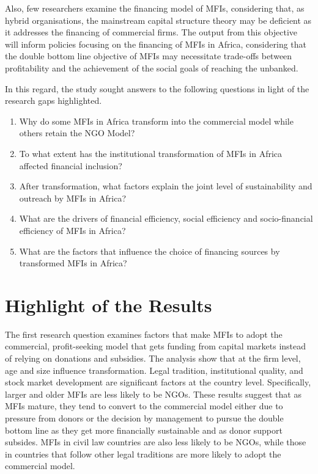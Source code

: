\documentclass[a4paper, nobind]{templates/ociamthesis}
\providecommand{\tightlist}{%
  \setlength{\itemsep}{0pt}\setlength{\parskip}{0pt}}
\begin{document}
Also, few researchers examine the financing model of MFIs, considering that, as hybrid organisations, the mainstream capital structure theory may be deficient as it addresses the financing of commercial firms. The output from this objective will inform policies focusing on the financing of MFIs in Africa, considering that the double bottom line objective of MFIs may necessitate trade-offs between profitability and the achievement of the social goals of reaching the unbanked.

In this regard, the study sought answers to the following questions in light of the research gaps highlighted.

\begin{enumerate}
\def\labelenumi{\arabic{enumi}.}
\tightlist
\item
  Why do some MFIs in Africa transform into the commercial model while others retain the NGO Model?
\item
  To what extent has the institutional transformation of MFIs in Africa affected financial inclusion?
\item
  After transformation, what factors explain the joint level of sustainability and outreach by MFIs in Africa?
\item
  What are the drivers of financial efficiency, social efficiency and socio-financial efficiency of MFIs in Africa?
\item
  What are the factors that influence the choice of financing sources by transformed MFIs in Africa?
\end{enumerate}

\hypertarget{highlight-of-the-results}{%
\section{Highlight of the Results}\label{highlight-of-the-results}}

The first research question examines factors that make MFIs to adopt the commercial, profit-seeking model that gets funding from capital markets instead of relying on donations and subsidies. The analysis show that at the firm level, age and size influence transformation. Legal tradition, institutional quality, and stock market development are significant factors at the country level. Specifically, larger and older MFIs are less likely to be NGOs. These results suggest that as MFIs mature, they tend to convert to the commercial model either due to pressure from donors or the decision by management to pursue the double bottom line as they get more financially sustainable and as donor support subsides. MFIs in civil law countries are also less likely to be NGOs, while those in countries that follow other legal traditions are more likely to adopt the commercial model.
\end{document}
